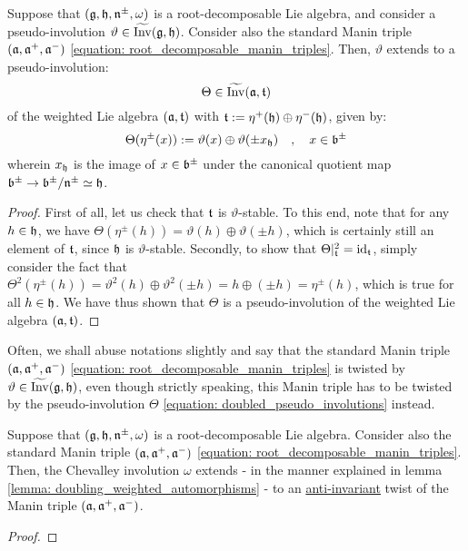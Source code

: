         \begin{lemma} \label{lemma: doubling_weighted_automorphisms}
            Suppose that $(\mathfrak{g}, \mathfrak{h}, \mathfrak{n}^{\pm}, \omega)$ is a root-decomposable Lie algebra, and consider a pseudo-involution $\vartheta \in \widetilde{\operatorname{Inv}}(\mathfrak{g}, \mathfrak{h})$. Consider also the standard Manin triple $(\mathfrak{a}, \mathfrak{a}^+, \mathfrak{a}^-)$ \eqref{equation: root_decomposable_manin_triples}. Then, $\vartheta$ extends to a pseudo-involution:
                \begin{equation} \label{equation: doubled_pseudo_involutions}
                    \Theta \in \widetilde{\operatorname{Inv}}(\mathfrak{a}, \mathfrak{t})
                \end{equation}
            of the weighted Lie algebra $(\mathfrak{a}, \mathfrak{t})$ with $\mathfrak{t} := \eta^+(\mathfrak{h}) \oplus \eta^-(\mathfrak{h})$, given by:
                $$\Theta( \eta^{\pm}(x) ) := \vartheta(x) \oplus \vartheta( \pm x_{\mathfrak{h}} ) \quad, \quad x \in \mathfrak{b}^{\pm}$$
            wherein $x_{\mathfrak{h}}$ is the image of $x \in \mathfrak{b}^{\pm}$ under the canonical quotient map $\mathfrak{b}^{\pm} \to \mathfrak{b}^{\pm}/\mathfrak{n}^{\pm} \simeq \mathfrak{h}$.
        \end{lemma}
            \begin{proof}
                First of all, let us check that $\mathfrak{t}$ is $\vartheta$-stable. To this end, note that for any $h \in \mathfrak{h}$, we have $\Theta( \eta^{\pm}(h) ) = \vartheta(h) \oplus \vartheta(\pm h)$, which is certainly still an element of $\mathfrak{t}$, since $\mathfrak{h}$ is $\vartheta$-stable. Secondly, to show that $\Theta|_{\mathfrak{t}}^2 = \mathrm{id}_{\mathfrak{t}}$, simply consider the fact that $\Theta^2( \eta^{\pm}(h) ) = \vartheta^2(h) \oplus \vartheta^2(\pm h) = h \oplus (\pm h) = \eta^{\pm}(h)$, which is true for all $h \in \mathfrak{h}$. We have thus shown that $\Theta$ is a pseudo-involution of the weighted Lie algebra $(\mathfrak{a}, \mathfrak{t})$.
            \end{proof}
        \begin{convention}
            Often, we shall abuse notations slightly and say that the standard Manin triple $(\mathfrak{a}, \mathfrak{a}^+, \mathfrak{a}^-)$ \eqref{equation: root_decomposable_manin_triples} is twisted by $\vartheta \in \widetilde{\operatorname{Inv}}(\mathfrak{g}, \mathfrak{h})$, even though strictly speaking, this Manin triple has to be twisted by the  pseudo-involution $\Theta$ \eqref{equation: doubled_pseudo_involutions} instead.
        \end{convention}

        \begin{lemma} \label{lemma: chevalley_involutions_twist_anti_invariantly}
            Suppose that $(\mathfrak{g}, \mathfrak{h}, \mathfrak{n}^{\pm}, \omega)$ is a root-decomposable Lie algebra. Consider also the standard Manin triple $(\mathfrak{a}, \mathfrak{a}^+, \mathfrak{a}^-)$ \eqref{equation: root_decomposable_manin_triples}. Then, the Chevalley involution $\omega$ extends - in the manner explained in lemma \ref{lemma: doubling_weighted_automorphisms} - to an \underline{anti-invariant} twist of the Manin triple $(\mathfrak{a}, \mathfrak{a}^+, \mathfrak{a}^-)$. 
        \end{lemma}
            \begin{proof}
            \end{proof}
            
